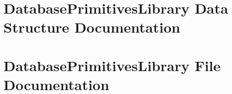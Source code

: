 \documentclass[letterpaper]{book}
\begin{document}
\chapter{Database\-Primitives\-Library Data Structure Documentation}























\chapter{Database\-Primitives\-Library File Documentation}






















































\printindex
\end{document}
